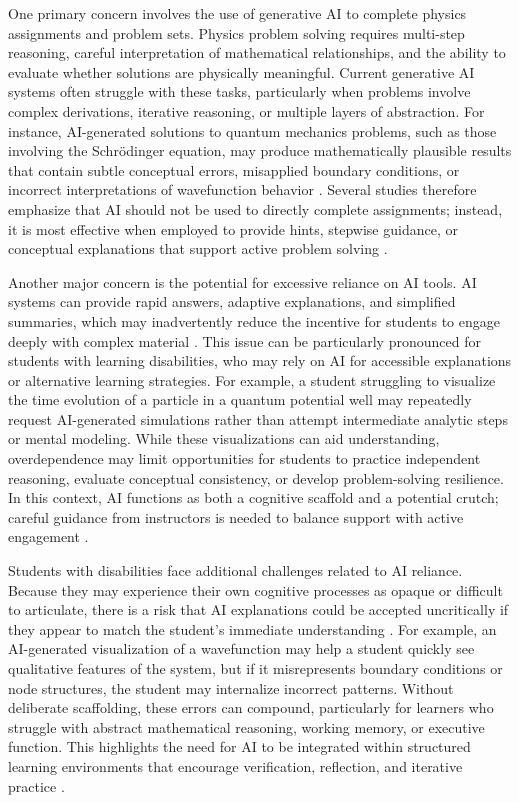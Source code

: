 \documentclass[]{aastex701}
\begin{document}
One primary concern involves the use of generative AI to complete physics assignments and problem sets. Physics problem solving requires multi-step reasoning, careful interpretation of mathematical relationships, and the ability to evaluate whether solutions are physically meaningful. Current generative AI systems often struggle with these tasks, particularly when problems involve complex derivations, iterative reasoning, or multiple layers of abstraction. For instance, AI-generated solutions to quantum mechanics problems, such as those involving the Schr\"{o}dinger equation, may produce mathematically plausible results that contain subtle conceptual errors, misapplied boundary conditions, or incorrect interpretations of wavefunction behavior \autocite{Wattanakasiwich2025, Weijers2025, Singh2001}. Several studies therefore emphasize that AI should not be used to directly complete assignments; instead, it is most effective when employed to provide hints, stepwise guidance, or conceptual explanations that support active problem solving \autocite{Wattanakasiwich2025, Weijers2025}.

Another major concern is the potential for excessive reliance on AI tools. AI systems can provide rapid answers, adaptive explanations, and simplified summaries, which may inadvertently reduce the incentive for students to engage deeply with complex material \autocite{Paglialunga2025, Voultsiou2025}. This issue can be particularly pronounced for students with learning disabilities, who may rely on AI for accessible explanations or alternative learning strategies. For example, a student struggling to visualize the time evolution of a particle in a quantum potential well may repeatedly request AI-generated simulations rather than attempt intermediate analytic steps or mental modeling. While these visualizations can aid understanding, overdependence may limit opportunities for students to practice independent reasoning, evaluate conceptual consistency, or develop problem-solving resilience. In this context, AI functions as both a cognitive scaffold and a potential crutch; careful guidance from instructors is needed to balance support with active engagement \autocite{Paglialunga2025, Voultsiou2025, Khowaja2025, Singh2001}.

Students with disabilities face additional challenges related to AI reliance. Because they may experience their own cognitive processes as opaque or difficult to articulate, there is a risk that AI explanations could be accepted uncritically if they appear to match the student's immediate understanding \autocite{Voultsiou2025, Khowaja2025}. For example, an AI-generated visualization of a wavefunction may help a student quickly see qualitative features of the system, but if it misrepresents boundary conditions or node structures, the student may internalize incorrect patterns. Without deliberate scaffolding, these errors can compound, particularly for learners who struggle with abstract mathematical reasoning, working memory, or executive function. This highlights the need for AI to be integrated within structured learning environments that encourage verification, reflection, and iterative practice \autocite{Paglialunga2025, Voultsiou2025, Weijers2025}.
\end{document}
